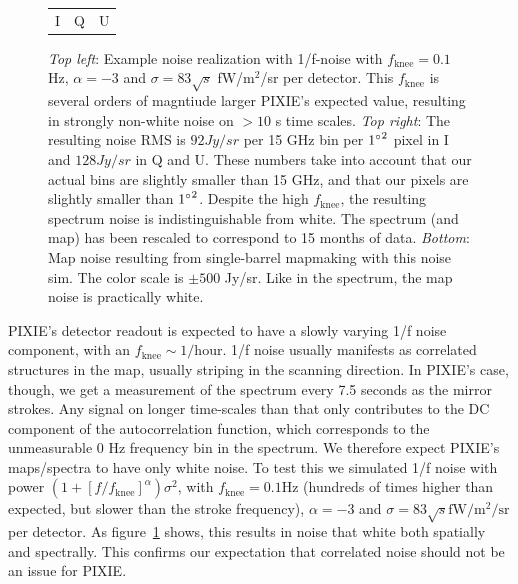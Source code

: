 \documentclass{article}
\begin{document}
\begin{figure}
\begin{tabular}{m{56mm}m{54.4mm}m{56mm}}
		\hspace{32mm}I & \hspace{32mm}Q & \hspace{32mm}U
	\end{tabular}
	\caption{\emph{Top left}: Example noise realization with 1/f-noise with
		$f_\textrm{knee} = 0.1$ Hz, $\alpha=-3$ and $\sigma = 83 \sqrt{s}$
		fW/$\textrm{m}^2$/sr per detector. This $f_\textrm{knee}$ is
		several orders of magntiude larger PIXIE's expected value,
		resulting in strongly non-white noise on $>10$ s time scales.
		\emph{Top right}: The resulting noise RMS is $92 Jy/sr$ per 15 GHz
		bin per ${1\degree}^2$ pixel in I and $128 Jy/sr$ in Q and U. These
		numbers take into account that our actual bins are slightly smaller than
		15 GHz, and that our pixels are slightly smaller than ${1\degree}^2$.
		Despite the high $f_\textrm{knee}$, the resulting spectrum noise is
		indistinguishable from white. The spectrum (and map) has been
		rescaled to correspond to 15 months of data. \emph{Bottom}: Map
		noise resulting from single-barrel mapmaking with this noise sim.
		The color scale is $\pm 500$ Jy/sr. Like in the spectrum, the map noise
		is practically white.}
		\label{fig:corrnoise}
\end{figure}
PIXIE's detector readout is expected to have a slowly varying 1/f noise component,
with an $f_\textrm{knee} \sim 1/\textrm{hour}$. 1/f noise usually manifests as
correlated structures in the map, usually striping in the scanning direction.
In PIXIE's case, though, we get a measurement of the spectrum every 7.5 seconds
as the mirror strokes. Any signal on longer time-scales than that only contributes
to the DC component of the autocorrelation function, which corresponds to the
unmeasurable 0 Hz frequency bin in the spectrum. We therefore expect PIXIE's
maps/spectra to have only white noise. To test this we simulated 1/f noise with
power $(1+[f/f_\textrm{knee}]^\alpha)\sigma^2$, with $f_\textrm{knee} = 0.1 \textrm{Hz}$
(hundreds of times higher than expected, but slower than the stroke frequency),
$\alpha=-3$ and $\sigma = 83\sqrt{s} \textrm{fW}/\textrm{m}^2/\textrm{sr}$ per detector.
As figure~\ref{fig:corrnoise} shows, this results in noise that white both
spatially and spectrally. This confirms our expectation that correlated noise should
not be an issue for PIXIE.
\end{document}
